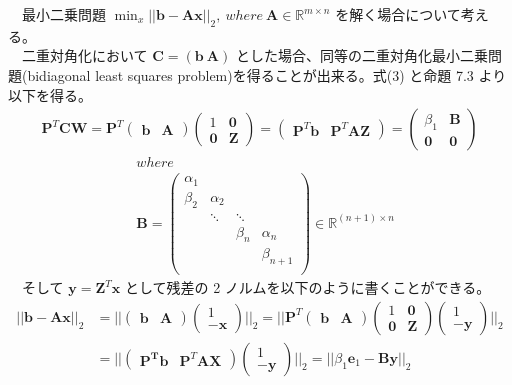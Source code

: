 \documentclass[a4paper,10pt]{jarticle}
\begin{document}
　最小二乗問題 \(\min_x||\bm{b}-\bm{A}\bm{x}||_2,\ where\ \bm{A}\in\mathbb{R}^{m\times n}\) を解く場合について考える。\\
　二重対角化において \(\bm{C} = (\bm{b}\  \bm{A})\) とした場合、同等の二重対角化最小二乗問題(bidiagonal least squares problem)を得ることが出来る。式(3) と命題 7.3 より以下を得る。\\
\begin{align*}
\bm{P}^T\bm{C}\bm{W} = \bm{P}^T
\begin{pmatrix}
\bm{b} & \bm{A}
\end{pmatrix}
\begin{pmatrix}
1 & \bm{0}\\
\bm{0} & \bm{Z}
\end{pmatrix}
=
\begin{pmatrix}
\bm{P}^T\bm{b}& \bm{P}^T\bm{A}\bm{Z}
\end{pmatrix}
=
\begin{pmatrix}
\beta_1 & \bm{B}\\
\bm{0} & \bm{0}
\end{pmatrix} \tag{3}
\end{align*}
\begin{align*}
&where \\
&\bm{B} =
\begin{pmatrix}
 \alpha_1& & & \\
\beta_2& \alpha_2&  & \\
&\ddots& \ddots &   \\
&& \beta_n& \alpha_n   \\
&&& \beta_{n+1}   \\
\end{pmatrix}
\in \mathbb{R}^{(n+1)\times n}
\end{align*}
　そして \(\bm{y} = \bm{Z}^T\bm{x}\) として残差の 2 ノルムを以下のように書くことができる。\\
\begin{align*}
||\bm{b} - \bm{A}\bm{x}||_2 &=
|| \begin{pmatrix}
\bm{b} & \bm{A}
\end{pmatrix}
\begin{pmatrix}
1 \\
-\bm{x}
\end{pmatrix}||_2 = 
||
\bm{P}^T
\begin{pmatrix}
\bm{b} & \bm{A}
\end{pmatrix}
\begin{pmatrix}
1 & \bm{0} \\
\bm{0} & \bm{Z}
\end{pmatrix}
\begin{pmatrix}
1 \\ - \bm{y}
\end{pmatrix}
||_2 \\
&= ||
\begin{pmatrix}
\bm{\bm{P}^T\bm{b}} & \bm{P}^T\bm{A}\bm{X}
\end{pmatrix}
\begin{pmatrix}
1 \\
-\bm{y}
\end{pmatrix}
||_2 =
|| \beta_1\bm{e}_1 - \bm{B}\bm{y}||_2 \tag{4}
\end{align*}
\end{document}
